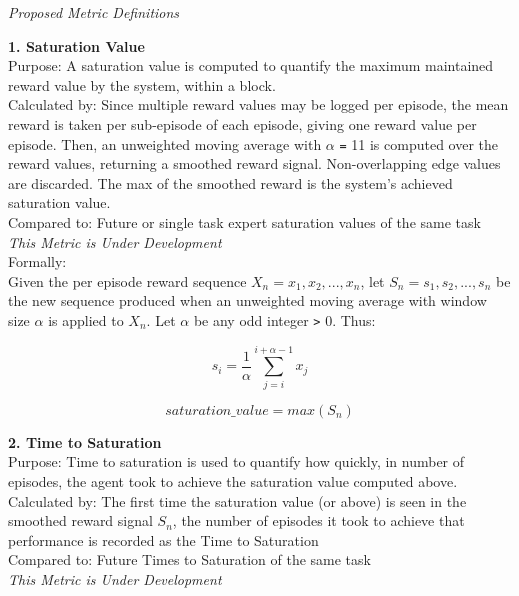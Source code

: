 \begin{large}
\textit{Proposed Metric Definitions}\\[0.1in]
\end{large}

\textbf{1. Saturation Value}\\
Purpose: A saturation value is computed to quantify the maximum maintained reward value by the system, within a block.\\
Calculated by: Since multiple reward values may be logged per episode, the mean reward is taken per sub-episode of each episode, giving one reward value per episode. Then, an unweighted moving average with \begin{math}\alpha\end{math} \verb|=| 11 is computed over the reward values, returning a smoothed reward signal. Non-overlapping edge values are discarded. The max of the smoothed reward is the system's achieved saturation value.\\
Compared to: Future or single task expert saturation values of the same task\\        
\textit{This Metric is Under Development}\\[0.1in]

Formally:\\[0.1in]

Given the per episode reward sequence \begin{math}X_n = x_1, x_2, ... , x_n\end{math}, let \begin{math}S_n = s_1, s_2, ... , s_n\end{math} be the new sequence produced when an unweighted moving average with window size \begin{math}\alpha\end{math} is applied to \begin{math}X_n\end{math}. Let \begin{math}\alpha\end{math} be any odd integer \verb|>| 0. Thus:


\[ s_i = \frac{1}{\alpha}\sum_{j=i}^{i+\alpha-1} {x_j} \]


\[saturation\_value = max(S_n)\]

\textbf{2. Time to Saturation}\\
Purpose: Time to saturation is used to quantify how quickly, in number of episodes, the agent took to achieve the saturation value computed above.\\
Calculated by: The first time the saturation value (or above) is seen in the smoothed reward signal \begin{math}S_n\end{math}, the number of episodes it took to achieve that performance is recorded as the Time to Saturation\\
Compared to: Future Times to Saturation of the same task\\
\textit{This Metric is Under Development}\\[0.1in]

